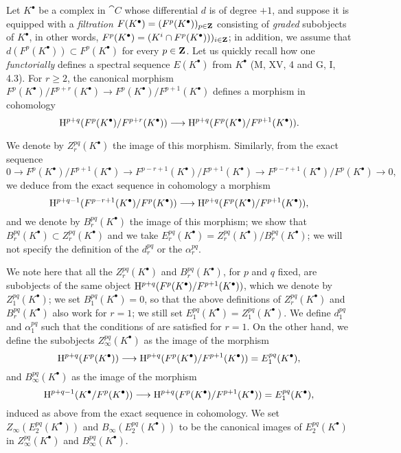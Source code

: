 \begin{env}[11.2.2]
\label{0.11.2.2}
Let $K^\bullet$ be a complex in $\cat{C}$ whose differential $d$ is of degree $+1$, and suppose it is equipped with a \emph{filtration $F(K^\bullet)=(F^p(K^\bullet))_{p\in\mathbf{Z}}$} consisting of \emph{graded} subobjects
of $K^\bullet$, in other words, $F^p(K^\bullet)=(K^i\cap F^p(K^\bullet)))_{i\in\mathbf{Z}}$; in addition, we assume that $d(F^p(K^\bullet))\subset F^p(K^\bullet)$ for every $p\in\mathbf{Z}$.
Let us quickly recall how one \emph{functorially} defines a spectral sequence $E(K^\bullet)$ from $K^\bullet$ (M, XV, 4 and G, I, 4.3).
For $r\geq 2$, the canonical morphism $F^p(K^\bullet)/F^{p+r}(K^\bullet)\to F^p(K^\bullet)/F^{p+1}(K^\bullet)$ defines a morphism in cohomology
\[
  \HH^{p+q}(F^p(K^\bullet)/F^{p+r}(K^\bullet))\to\HH^{p+q}(F^p(K^\bullet)/F^{p+1}(K^\bullet)).
\]

We denote by $Z_r^{pq}(K^\bullet)$ the image of this morphism.
Similarly, from the exact sequence
\[
  0\to F^p(K^\bullet)/F^{p+1}(K^\bullet)\to F^{p-r+1}(K^\bullet)/F^{p+1}(K^\bullet)\to F^{p-r+1}(K^\bullet)/F^p(K^\bullet)\to 0,
\]
we deduce from the exact sequence in cohomology a morphism
\[
  \HH^{p+q-1}(F^{p-r+1}(K^\bullet)/F^p(K^\bullet))\to\HH^{p+q}(F^p(K^\bullet)/F^{p+1}(K^\bullet)),
\]
and we denote by $B_r^{pq}(K^\bullet)$ the image of this morphism; we show that $B_r^{pq}(K^\bullet)\subset Z_r^{pq}(K^\bullet)$ and we take $E_r^{pq}(K^\bullet)=Z_r^{pq}(K^\bullet)/B_r^{pq}(K^\bullet)$; we will not specify the definition of the $d_r^{pq}$ or the $\alpha_r^{pq}$.

We note here that all the $Z_r^{pq}(K^\bullet)$ and $B_r^{pq}(K^\bullet)$, for $p$ and $q$ fixed, are subobjects of the same object $\mathrm{H}^{p+q}(F^p(K^\bullet)/F^{p+1}(K^\bullet))$, which we denote by $Z_1^{pq}(K^\bullet)$; we set $B_1^{pq}(K^\bullet)=0$, so that the above definitions of $Z_r^{pq}(K^\bullet)$ and $B_r^{pq}(K^\bullet)$ also work for $r=1$; we still set $E_1^{pq}(K^\bullet)=Z_1^{pq}(K^\bullet)$.
We define $d_1^{pq}$ and $\alpha_1^{pq}$ such that the conditions of  are satisfied for $r=1$.
On the other hand, we define the subobjects $Z_\infty^{pq}(K^\bullet)$ as the image of the morphism
\[
  \HH^{p+q}(F^p(K^\bullet))\to\HH^{p+q}(F^p(K^\bullet)/F^{p+1}(K^\bullet))=E_1^{pq}(K^\bullet),
\]
and $B_\infty^{pq}(K^\bullet)$ as the image of the morphism
\[
  \HH^{p+q-1}(K^\bullet/F^p(K^\bullet))\to\HH^{p+q}(F^p(K^\bullet)/F^{p+1}(K^\bullet))=E_1^{pq}(K^\bullet),
\]
induced as above from the exact sequence in cohomology.
We set $Z_\infty(E_2^{pq}(K^\bullet))$ and $B_\infty(E_2^{pq}(K^\bullet))$ to be the canonical images of $E_2^{pq}(K^\bullet)$ in $Z_\infty^{pq}(K^\bullet)$ and $B_\infty^{pq}(K^\bullet)$.


\end{env}
